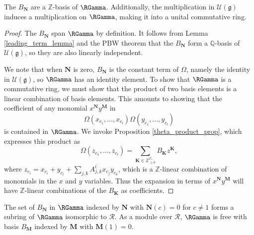 \begin{proposition} \label{r_gamma_is_an_algebra_prop}
The $B_{\mathbf{N}}$ are a $\mathbb{Z}$-basis of $\RGamma$. Additionally, the multiplication in $\mathcal{U}(\mathfrak{g})$ induces a multiplication on $\RGamma$, making it into a unital commutative ring.
\end{proposition}
\begin{proof}
The $B_{\mathbf{N}}$ span $\RGamma$ by definition. It follows from Lemma \ref{leading_term_lemma} and the PBW theorem that the $B_{\mathbf{N}}$ form a $\mathbb{Q}$-basis of $\mathcal{U}(\mathfrak{g})$, so they are also linearly independent.

We note that when $\mathbf{N}$ is zero, $B_{\mathbf{N}}$ is the constant term of $\Omega$, namely the identity in $\mathcal{U}(\mathfrak{g})$, so $\RGamma$ has an identity element. To show that $\RGamma$ is a commutative ring, we must show that the product of two basis elements is a linear combination of basis elements. This amounts to showing that the coefficient of any monomial $x^{\mathbf{N}} y^{\mathbf{M}}$ in 
\[
\Omega(x_{c_1}, \ldots, x_{c_l}) \Omega(y_{c_1}, \ldots, y_{c_l})
\]
is contained in $\RGamma$. We invoke Proposition \ref{theta_product_prop}, which expresses this product as 
\[
\Omega(z_{c_1}, \ldots, z_{c_l}) = \sum_{\mathbf{K} \in \mathbb{Z}_{\geq 0}^{\Gamma_*}} B_{\mathbf{K}} z^{\mathbf{K}},
\]
where $z_{c_i} = x_{c_i} + y_{c_i} + \sum_{j,k}A_{j, k}^{i}x_{c_j} y_{c_k}$, which is a $\mathbb{Z}$-linear combination of monomials in the $x$ and $y$ variables. Thus the expansion in terms of $x^{\mathbf{N}} y^{\mathbf{M}}$ will have $\mathbb{Z}$-linear combinations of the $B_{\mathbf{K}}$ as coefficients.
\end{proof}

\begin{proposition} \label{rgamma_free_over_r_prop}
The set of $B_{\mathbf{N}}$ in $\RGamma$ indexed by $\mathbf{N}$ with $\mathbf{N}(c) = 0$ for $c \neq 1$ forms a subring of $\RGamma$ isomorphic to $\mathcal{R}$. As a module over $\mathcal{R}$, $\RGamma$ is free with basis $B_{\mathbf{M}}$ indexed by $\mathbf{M}$ with $\mathbf{M}(1) = 0$.
\end{proposition}

